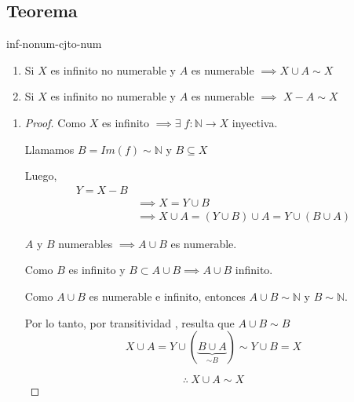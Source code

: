 \subsection{Teorema}

\begin{teorema}{}{inf-nonum-cjto-num}
    \begin{enumerate}
        \item Si $X$ es infinito no numerable y $A$ es numerable 
            $\implies X\cup A \sim X$

        \item Si $X$ es infinito no numerable y $A$ es numerable $\implies$
            $X - A \sim X$
    \end{enumerate}
\end{teorema}

\begin{enumerate}
    \item \begin{proof}\phantom{.}

            Como $X$ es infinito $\implies \exists \; f: \mathbb{N} \to X$
            inyectiva.

            Llamamos $B = Im(f) \sim \mathbb{N}$ y $B \subseteq X$

            Luego, 
            \begin{align*}
                Y = X - B & \\
                &\implies X = Y \cup B \\
                &\implies X \cup A = (Y \cup B) \cup A = Y \cup (B \cup A)
            \end{align*}

            $A$ y $B$ numerables $\implies A \cup B$ es numerable.

            Como $B$ es infinito y $B \subset A \cup B \implies A \cup B$
            infinito.

            Como $A\cup B$ es numerable e infinito, entonces 
            $A\cup B \sim \mathbb{N}$ y $B \sim \mathbb{N}$.
    
            Por lo tanto, por transitividad , resulta que $A \cup B \sim B$
            \[ X \cup A = Y \cup (\underbrace{B \cup A}_{\sim B}) 
            \sim Y \cup B = X \]

            \[ \therefore ~ X \cup A \sim X \]


\end{proof}
\end{enumerate}
